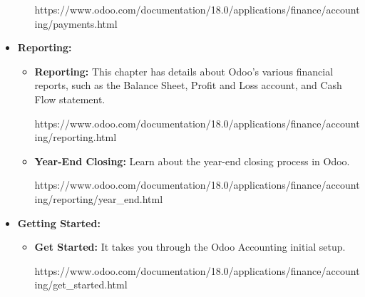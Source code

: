 \documentclass[11pt,a4paper]{article}
\begin{document}
\begin{itemize}
\begin{itemize}
        https://www.odoo.com/documentation/18.0/applications/finance/accounting/payments.html
    \end{itemize}
    \item \textbf{Reporting:} 
    \begin{itemize}
        \item \textbf{Reporting:} This chapter has details about Odoo's various financial reports, such as the Balance Sheet, Profit and Loss account, and Cash Flow statement.
        
        https://www.odoo.com/documentation/18.0/applications/finance/accounting/reporting.html

        \item \textbf{Year-End Closing:} Learn about the year-end closing process in Odoo.
        
        https://www.odoo.com/documentation/18.0/applications/finance/accounting/reporting/year\_end.html
    \end{itemize}

    \item \textbf{Getting Started:}
    \begin{itemize}
        \item \textbf{Get Started:} It takes you through the Odoo Accounting initial setup.
        
        https://www.odoo.com/documentation/18.0/applications/finance/accounting/get\_started.html
    \end{itemize}
\end{itemize}
\end{document}
